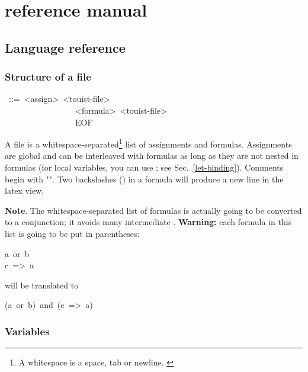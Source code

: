 \chapter{\touist{} reference manual}\label{sec-language-reference}%

\section{Language reference}

\subsection{Structure of a \touist file}\label{sec-structure-of-a-touist-file}%
\begin{mdpre}%
~::=~{\textless{}assign\textgreater{}}~{\textless{}touist-file\textgreater{}}\\
~~~~~~~~~~~~~~~~\textbar{}~{\textless{}formula\textgreater{}}~{\textless{}touist-file\textgreater{}}\\
~~~~~~~~~~~~~~~~\textbar{}~EOF%
\end{mdpre}\noindent A \touist file is a whitespace-separated\footnote{\noindent A whitespace is a space, tab or newline.%
\label{fn-whitespace}%
} list of
assignments and formulas. Assignments are global and can be interleaved
with formulas as long as they are not nested in formulas (for local
variables, you can use ; see Sec.~\ref{let-binding}). Comments begin
with "". Two backslashes (\mdcode{\textbackslash{}\textbackslash{}}) in a formula will produce a new
line in the latex view.

\noindent\textbf{Note}.
The whitespace-separated list of formulas is actually going to be
converted to a conjunction; it avoids many intermediate .
\textbf{Warning:} each formula in this list is going to be put in
parentheses:%
\begin{mdpre}%
\noindent a~or~b\\
c~=\textgreater{}~a%
\end{mdpre}\noindent will be translated to
\begin{mdpre}%
\noindent(a~or~b)~and~(c~=\textgreater{}~a)%
\end{mdpre}\label{newline-and-note}%

\subsection{Variables}\label{sec-variables}%

